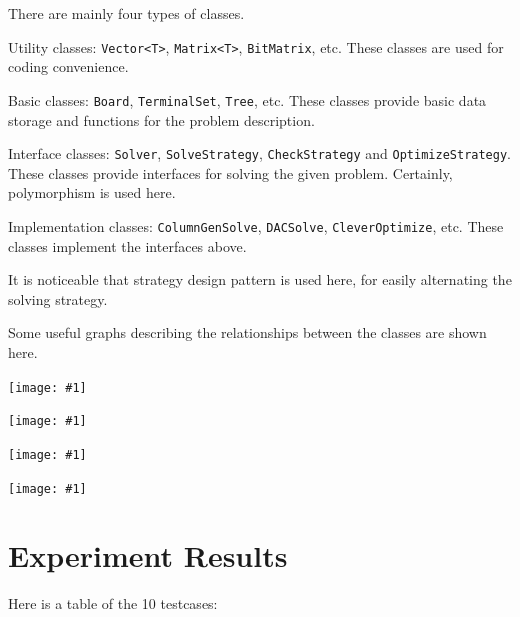 \documentclass[12pt, a4paper]{article}
\newcommand{\fullimage}[1]{
	\begin{flushleft}
		\texttt{[image: \#1]}
	\end{flushleft}
}
\begin{document}
	There are mainly four types of classes.

Utility classes: \texttt{Vector<T>}, \texttt{Matrix<T>}, \texttt{BitMatrix}, etc. These classes are used for coding convenience.

Basic classes: \texttt{Board}, \texttt{TerminalSet}, \texttt{Tree}, etc. These classes provide basic data storage and functions for the problem description.

Interface classes: \texttt{Solver}, \texttt{SolveStrategy}, \texttt{CheckStrategy} and \texttt{OptimizeStrategy}. These classes provide interfaces for solving the given problem. Certainly, polymorphism is used here.

Implementation classes: \texttt{ColumnGenSolve}, \texttt{DACSolve}, \texttt{CleverOptimize}, etc. These classes implement the interfaces above.

It is noticeable that strategy design pattern is used here, for easily alternating the solving strategy.

Some useful graphs describing the relationships between the classes are shown here.

\fullimage{1.png}
\fullimage{2.png}
\fullimage{3.png}
\fullimage{4.png}
	
	\section{Experiment Results}
	
	Here is a table of the 10 testcases:
\end{document}
